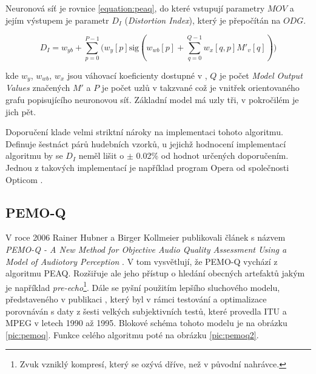 Neuronová síť je rovnice \ref{equation:peaq}, do které vstupují parametry $MOV$ a jejím výstupem je parametr $D_I$ (\textit{Distortion Index}), který je přepočítán na $ODG$.


\begin{equation}
    D_I = w_{yb} + \sum\limits_{p=0}^{P-1}{\big(w_y[p]\text{sig}(w_{wb}[p]+\sum\limits_{q=0}^{Q-1} w_x[q,p]M'_v[q])\big)}
    \label{equation:peaq}
\end{equation}

\noindent kde $w_{y}$, $w_{wb}$, $w_{x}$ jsou váhovací  koeficienty dostupné v \cite{kabal}, $Q$ je počet \textit{Model Output Values} značených $M'$ a $P$ je počet uzlů v takzvané  což je vnitřek orientovaného grafu popisujícího neuronovou síť. Základní model má uzly tři, v pokročilém je jich pět.   

Doporučení \cite{itur:1387} klade velmi striktní nároky na implementaci tohoto algoritmu. Definuje šestnáct párů hudebních vzorků, u jejichž hodnocení implementací algoritmu by se $D_I$ neměl lišit o $\pm$ 0.02\% od hodnot určených doporučením. Jednou z takových implementací je například program Opera od společnosti Opticom \cite{web:opticom}. 



\subsection{PEMO-Q}

V roce 2006 Rainer Hubner a Birger Kollmeier publikovali článek s názvem \textit{PEMO-Q - A New Method for Objective Audio Quality Assessment Using a Model of Audiotory Perception} \cite{article:pemoq}. V tom vysvětlují, že PEMO-Q vychází z algoritmu PEAQ. Rozšiřuje ale jeho přístup o hledání obecných artefaktů jakým je například \textit{pre-echo}\footnote{Zvuk vzniklý kompresí, který se ozývá dříve, než v původní nahrávce.}. Dále se pyšní použitím lepšího sluchového modelu, představeného v publikaci \cite{book:dau}, který byl v rámci testování a optimalizace porovnáván s daty z šesti velkých subjektivních testů, které provedla ITU a MPEG v letech 1990 až 1995. Blokové schéma tohoto modelu je na obrázku \ref{pic:pemoq}. Funkce celého algoritmu poté na obrázku \ref{pic:pemoq2}.

